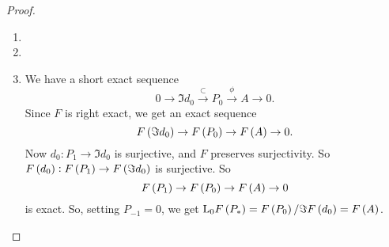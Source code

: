 \begin{proof}
\hfill
\begin{enumerate}
\item
\item
\item We have a short exact sequence
$$ 0 \to \Im d_0 \xrightarrow{\subset} P_0 \xrightarrow{\phi} A \to 0. $$
Since $ F $ is right exact, we get an exact sequence
$$ F\br{\Im d_0} \to F\br{P_0} \to F\br{A} \to 0. $$
Now $ d_0 : P_1 \to \Im d_0 $ is surjective, and $ F $ preserves surjectivity. So $ F\br{d_0} : F\br{P_1} \to F\br{\Im d_0} $ is surjective. So
$$ F\br{P_1} \to F\br{P_0} \to F\br{A} \to 0 $$
is exact. So, setting $ P_{-1} = 0 $, we get $ \L_0F\br{P_*} = F\br{P_0} / \Im F\br{d_0} = F\br{A} $.
\end{enumerate}
\end{proof}

